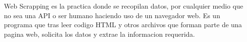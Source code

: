Web Scrapping es la practica donde se recopilan datos, por cualquier medio que no sea una API o ser humano haciendo uso de un navegador web. Es un programa que tras leer codigo HTML y otros archivos que forman parte de una pagina web, solicita los datos y extrae la informacion requerida.\cite{mitchell2015web}